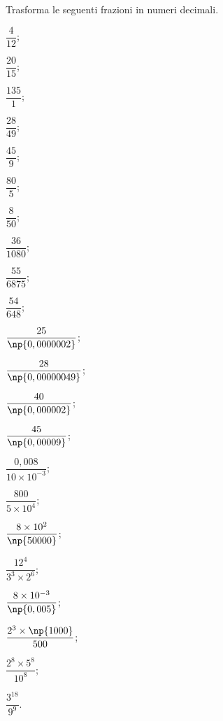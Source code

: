 \begin{esercizio}
\label{ese:3.25}
Trasforma le seguenti frazioni in numeri decimali.
\begin{multicols}{4}
\begin{enumeratea}
\spazielenx
\item $\dfrac{4}{12}$;
\item $\dfrac{20}{15}$;
\item $\dfrac{135}{1}$;
\item $\dfrac{28}{49}$;
\item $\dfrac{45}{9}$;
\item $\dfrac{80}{5}$;
\item $\dfrac{8}{50}$;
\item $\dfrac{36}{1080}$;
\item $\dfrac{55}{6875}$;
\item $\dfrac{54}{648}$;
\item $\dfrac{25}{\np{0,0000002}}$;
\item $\dfrac{28}{\np{0,00000049}}$;
\item $\dfrac{40}{\np{0,000002}}$;
\item $\dfrac{45}{\np{0,00009}}$;
\item $\dfrac{0,008}{10\times 10^{-3}}$;
\item $\dfrac{800}{5\times 10^{4}}$;
\item $\dfrac{8\times 10^{2}}{\np{50000}}$;
\item $\dfrac{12^{4}}{3^{3} \times 2^{6}}$;
\item $\dfrac{8\times 10^{-3}}{\np{0,005}}$;
\item $\dfrac{2^{3}\times \np{1000}}{500}$;
\item $\dfrac{2^{8}\times 5^{8}}{10^{8}}$;
\item $\dfrac{3^{18}}{9^{9}}$.
\end{enumeratea}
\end{multicols}
\end{esercizio}

